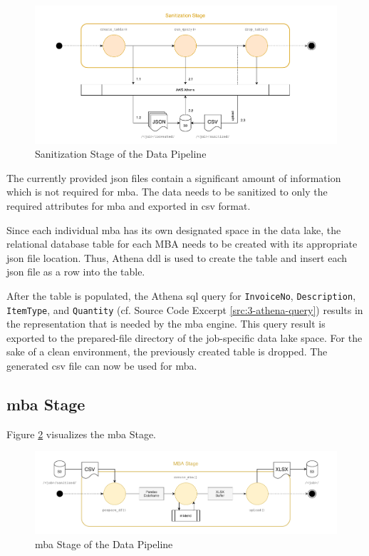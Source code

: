 \begin{figure}[h!]
	\includegraphics[width=\linewidth]{main-matter/img/3-3-3-sanitize}
	\caption{Sanitization Stage of the Data Pipeline}
	\label{fig:3-sanitize}	
\end{figure}

The currently provided \ac{json} files contain a significant amount of information which is not required for \ac{mba}. The data needs to be sanitized to only the required attributes for \ac{mba} and exported in \ac{csv} format.

Since each individual \ac{mba} has its own designated space in the data lake, the relational database table for each MBA needs to be created with its appropriate \ac{json} file location. Thus, Athena \ac{ddl} is used to create the table and insert each \ac{json} file as a row into the table.

After the table is populated, the Athena \ac{sql} query for \texttt{InvoiceNo}, \texttt{Description}, \texttt{ItemType}, and \texttt{Quantity} (cf. Source Code Excerpt \ref{src:3-athena-query}) results in the representation that is needed by the \ac{mba} engine. This query result is exported to the prepared-file directory of the job-specific data lake space. For the sake of a clean environment, the previously created table is dropped. The generated \ac{csv} file can now be used for \ac{mba}.

\subsection{\acs{mba} Stage}
Figure \ref{fig:3-mba} visualizes the \ac{mba} Stage.

\begin{figure}[h!]
	\includegraphics[width=\linewidth]{main-matter/img/3-3-4-mba}
	\caption{\acs{mba} Stage of the Data Pipeline}
	\label{fig:3-mba}	
\end{figure}

